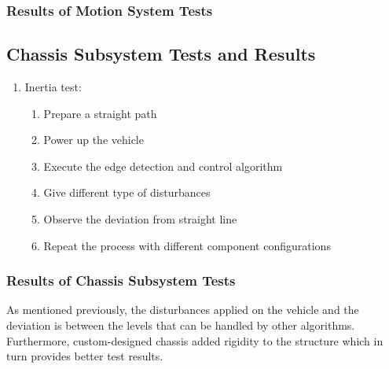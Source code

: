 \documentclass[a4paper,12pt]{article}
\begin{document}
\subsubsection*{Results of Motion System Tests}








\subsection {Chassis Subsystem Tests and Results}

\begin{enumerate}

\item Inertia test: 

\begin{enumerate}

\item Prepare a straight path

\item Power up the vehicle 

\item Execute the edge detection and control algorithm

\item Give different type of disturbances 

\item Observe the deviation from straight line

\item Repeat the process with different component configurations

\end{enumerate} 

\end{enumerate}


\subsubsection*{Results of Chassis Subsystem Tests}

As mentioned previously, the disturbances applied on the vehicle and the deviation is between the levels that can be handled by other algorithms. Furthermore, custom-designed chassis added rigidity to the structure which in turn provides better test results.
\end{document}
